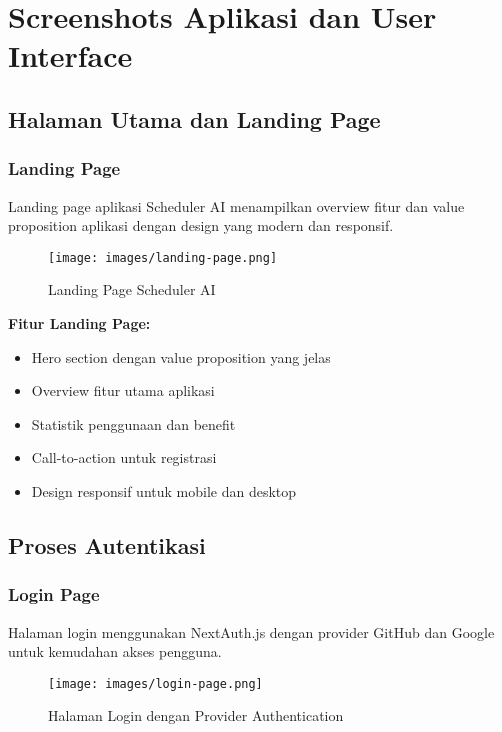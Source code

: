 \section{Screenshots Aplikasi dan User Interface}

\subsection{Halaman Utama dan Landing Page}

\subsubsection{Landing Page}
Landing page aplikasi Scheduler AI menampilkan overview fitur dan value proposition aplikasi dengan design yang modern dan responsif.

\begin{figure}[H]
\centering
\texttt{[image: images/landing-page.png]}
\caption{Landing Page Scheduler AI}
\label{fig:landing-page}
\end{figure}

\textbf{Fitur Landing Page:}
\begin{itemize}
\item Hero section dengan value proposition yang jelas
\item Overview fitur utama aplikasi
\item Statistik penggunaan dan benefit
\item Call-to-action untuk registrasi
\item Design responsif untuk mobile dan desktop
\end{itemize}

\subsection{Proses Autentikasi}

\subsubsection{Login Page}
Halaman login menggunakan NextAuth.js dengan provider GitHub dan Google untuk kemudahan akses pengguna.

\begin{figure}[H]
\centering
\texttt{[image: images/login-page.png]}
\caption{Halaman Login dengan Provider Authentication}
\label{fig:login-page}
\end{figure}

